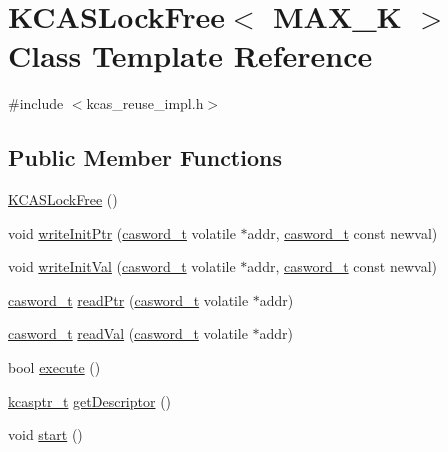 \hypertarget{classKCASLockFree}{}\section{K\+C\+A\+S\+Lock\+Free$<$ M\+A\+X\+\_\+K $>$ Class Template Reference}
\label{classKCASLockFree}


{\ttfamily \#include $<$kcas\+\_\+reuse\+\_\+impl.\+h$>$}

\subsection*{Public Member Functions}
\begin{DoxyCompactItemize}
\item 
\hyperlink{classKCASLockFree_a766a5a353ea5229f9dadb61076c06c14}{K\+C\+A\+S\+Lock\+Free} ()
\item 
void \hyperlink{classKCASLockFree_a4e6ea63f89337e45fe2d89903c399c23}{write\+Init\+Ptr} (\hyperlink{rq__unsafe_8h_ad45142aaf2ff20a036dc6242b8483e9c}{casword\+\_\+t} volatile $\ast$addr, \hyperlink{rq__unsafe_8h_ad45142aaf2ff20a036dc6242b8483e9c}{casword\+\_\+t} const newval)
\item 
void \hyperlink{classKCASLockFree_a3866dbd432d71b3d97338f6b0839d89b}{write\+Init\+Val} (\hyperlink{rq__unsafe_8h_ad45142aaf2ff20a036dc6242b8483e9c}{casword\+\_\+t} volatile $\ast$addr, \hyperlink{rq__unsafe_8h_ad45142aaf2ff20a036dc6242b8483e9c}{casword\+\_\+t} const newval)
\item 
\hyperlink{rq__unsafe_8h_ad45142aaf2ff20a036dc6242b8483e9c}{casword\+\_\+t} \hyperlink{classKCASLockFree_a54d120c4f122f75613aef3235e60f6a5}{read\+Ptr} (\hyperlink{rq__unsafe_8h_ad45142aaf2ff20a036dc6242b8483e9c}{casword\+\_\+t} volatile $\ast$addr)
\item 
\hyperlink{rq__unsafe_8h_ad45142aaf2ff20a036dc6242b8483e9c}{casword\+\_\+t} \hyperlink{classKCASLockFree_a46fecb32042ea91275aaf94592771e40}{read\+Val} (\hyperlink{rq__unsafe_8h_ad45142aaf2ff20a036dc6242b8483e9c}{casword\+\_\+t} volatile $\ast$addr)
\item 
bool \hyperlink{classKCASLockFree_a68b4bbf1a5895cf96f7cddde59990e9e}{execute} ()
\item 
\hyperlink{kcas__reuse__impl_8h_a5bbc81d391bfd6b4288a0d33f105a0b2}{kcasptr\+\_\+t} \hyperlink{classKCASLockFree_a928a7be795b2fb894dd6ecf1be757d6e}{get\+Descriptor} ()
\item 
void \hyperlink{classKCASLockFree_ae4b43c2e64326f35df2c6c90ca33f448}{start} ()

\end{DoxyCompactItemize}
